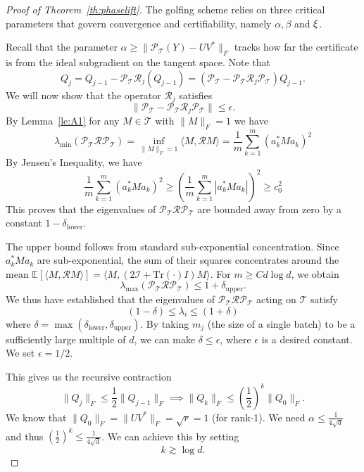 \begin{proof}[Proof of Theorem~\ref{th:phaselift}]
The golfing scheme relies on three critical parameters that govern convergence and certifiability, namely $\alpha, \beta$ and $\xi$. 

Recall that the parameter $\alpha \ge \|\mathcal{P}_{\mathcal{T}}(Y) - UV^*\|_F$ tracks how far the certificate is from the ideal subgradient on the tangent space.
Note that 
$$Q_j = Q_{j-1} - \mathcal{P}_{\mathcal{T}} \mathcal{R}_j (Q_{j-1})  = (\mathcal{P}_{\mathcal{T}} - \mathcal{P}_{\mathcal{T}} \mathcal{R}_j \mathcal{P}_{\mathcal{T}}) Q_{j-1}.$$
We will now show  that the operator $\mathcal{R}_j$ satisfies
$$\|\mathcal{P}_{\mathcal{T}} - \mathcal{P}_{\mathcal{T}} \mathcal{R}_j \mathcal{P}_{\mathcal{T}}\| \le \epsilon.$$
By Lemma~\ref{le:A1} for any $M \in \mathcal{T}$ with $\|M\|_F = 1$ we have
$$\lambda_{\min}(\mathcal{P}_{\mathcal{T}} \mathcal{R} \mathcal{P}_{\mathcal{T}}) = \inf_{\|M\|_F=1} \langle M, \mathcal{R} M \rangle = \frac{1}{m} \sum_{k=1}^m (a_k^* M a_k)^2$$
By Jensen's Inequality, we have
$$\frac{1}{m} \sum_{k=1}^m (a_k^* M a_k)^2 \ge \left( \frac{1}{m} \sum_{k=1}^m |a_k^* M a_k| \right)^2 \ge c_0^2$$
This proves that the eigenvalues of $\mathcal{P}_{\mathcal{T}} \mathcal{R} \mathcal{P}_{\mathcal{T}}$ are bounded away from zero by a constant $1 - \delta_{\text{lower}}$.

The upper bound follows from standard sub-exponential concentration. Since $a_k^* M a_k$ are sub-exponential, the sum of their squares concentrates around the mean $\mathbb{E}[\langle M, \mathcal{R} M \rangle] = \langle M, (2 \mathcal{I} + \text{Tr}(\cdot)I) M \rangle$.
For $m \ge C d \log d$, we obtain
$$\lambda_{\max}(\mathcal{P}_{\mathcal{T}} \mathcal{R} \mathcal{P}_{\mathcal{T}}) \le 1 + \delta_{\text{upper}}.$$
We thus have established that the eigenvalues of
 $\mathcal{P}_{\mathcal{T}} \mathcal{R} \mathcal{P}_{\mathcal{T}}$ acting on  $\mathcal{T}$  satisfy
$$(1-\delta) \le \lambda_i \le (1+\delta)$$
where $\delta = \max(\delta_{\text{lower}}, \delta_{\text{upper}})$.
By taking $m_j$ (the size of a single batch) to be a sufficiently large multiple of $d$, we can make $\delta \le \epsilon$, where $\epsilon$ is a desired constant. We set
$\epsilon = 1/2$. 
 
This gives us the recursive contraction
\begin{equation}\label{eq:Qbound1}
\|Q_j\|_F \le \frac{1}{2} \|Q_{j-1}\|_F \implies \|Q_k\|_F \le \left(\frac{1}{2}\right)^k \|Q_0\|_F.
\end{equation}
We know that $\|Q_0\|_F = \|UV^*\|_F = \sqrt{r} = 1$ (for rank-1). We need $\alpha \le \frac{1}{4\sqrt{d}}$ and thus $\left(\frac{1}{2}\right)^k \le \frac{1}{4\sqrt{d}}$. We can achieve this by setting
$$k \gtrsim \log d.$$


\end{proof}
